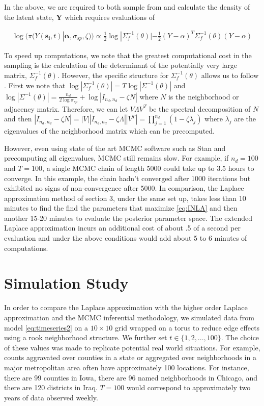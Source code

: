 \documentclass[11pt]{isuthesis}
\begin{document}
	In the above, we are required to both sample from and calculate the density of the latent state, $\boldsymbol{Y}$ which requires evaluations of 
	
	
	\begin{align}
	\log(\pi(Y(\boldsymbol{s_i},t)|\boldsymbol{\alpha},\sigma_{sp},\zeta)) \propto  \frac{1}{2} \log | \Sigma_f^{-1}(\theta)| - \frac{1}{2}(Y-\alpha)^T\Sigma_f^{-1}(\theta)(Y-\alpha) \label{eq:log Y}
	\end{align}
	
	To speed up computations, we note that the greatest computational cost in the sampling is the calculation of the determinant of the potentially very large matrix, $\Sigma_f^{-1}(\theta)$.  However, the specific structure for $\Sigma_f^{-1}(\theta)$ allows us to follow \cite{jin2005generalized}.  First we note that $\log | \Sigma_f^{-1}(\theta)|  = T \log | \Sigma^{-1}(\theta)|$ and $\log|\Sigma^{-1}(\theta)|=\frac{n_d}{2\log\sigma_{sp}}+\log|I_{n_d,n_d}-\zeta N|$ where $N$ is the neighborhood or adjacency matrix.  Therefore, we can let $V \Lambda V^T$ be the spectral decomposition of $N$ and then $|I_{n_d,n_d}-\zeta N|=|V| |I_{n_d,n_d}-\zeta \Lambda| |V^T|=\prod_{j=1}^{n_d}\left(1-\zeta \lambda_j\right)$ where $\lambda_j$ are the eigenvalues of the neighborhood matrix which can be precomputed.  
	
	However, even using state of the art MCMC software such as Stan and precomputing all eigenvalues, MCMC still remains slow.  For example, if $n_d=100$ and $T=100$, a single MCMC chain of length 5000 could take up to 3.5 hours to converge.  In this example, the chain hadn't converged after 1000 iterations but exhibited no signs of non-convergence after 5000.  In comparison, the Laplace approximation method of section 3, under the same set up, takes less than 10 minutes to find the find the parameters that maximize \eqref{eq:INLA} and then another 15-20 minutes to evaluate the posterior parameter space.  The extended Laplace approximation incurs an additional cost of about .5 of a second per evaluation and under the above conditions would add about 5 to 6 minutes of computations.
	
	
	\section{Simulation Study}\label{Sec:Sim2}
	
	In order to compare the Laplace approximation with the higher order Laplace approximation and the MCMC inferential methodology, we simulated data from model \eqref{eq:timeseries2} on a $10 \times 10$ grid wrapped on a torus to reduce edge effects using a rook neighborhood structure.  We further set $t \in \{1,2,...,100\}$.  The choice of these values was made to replicate potential real world situations.  For example, counts aggravated over counties in a state or aggregated over neighborhoods in a major metropolitan area often have approximately 100 locations.  For instance, there are 99 counties in Iowa, there are 96 named neighborhoods in Chicago, and there are 120 districts in Iraq.  $T=100$ would correspond to approximately two years of data observed weekly.
	
\end{document}
